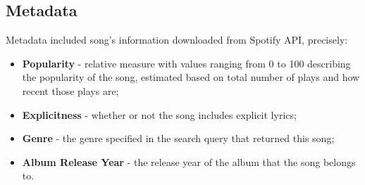 

\subsection{Metadata}
\label{sec:metadata}
Metadata included song's information downloaded from Spotify API, precisely:

\begin{itemize}
  \item \textbf{Popularity} - relative measure with values ranging from 0 to
    100 describing the popularity of the song, estimated based on total
    number of plays and how recent  those plays are;
  \item \textbf{Explicitness} - whether or not the song includes explicit
    lyrics;
  \item \textbf{Genre} - the genre specified in the search query that returned
    this song;
  \item \textbf{Album Release Year} - the release year of the album that the
    song belongs to.
\end{itemize}


